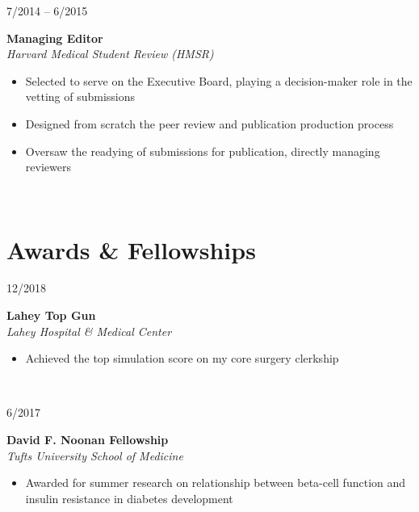 \documentclass{article}
\newcommand\colleft{.20}
\newcommand\colright{.75}
\newcommand{\entryfour}[4]
	{
		\begin{minipage}[t]{\colleft\textwidth}
		\hfill \textsc{#1}
		\end{minipage}
		\hfill\vline\hfill
		\begin{minipage}[t]{\colright\textwidth}
		{\bf#2}\\
		\textit{#3}
		\footnotesize{#4}
		\end{minipage}\\
		\entryvspace
	}%
\newcommand{\entryvspace}{\vspace{0.5em}}
\begin{document}

	\entryfour{7/2014 -- 6/2015}{Managing Editor}{Harvard Medical Student Review (HMSR)}{%
	\begin{itemize}
		\item Selected to serve on the Executive Board, playing a decision-maker role in the vetting of submissions
		\item Designed from scratch the peer review and publication production process
		\item Oversaw the readying of submissions for publication, directly managing reviewers
	\end{itemize}
	}

	\section*{Awards \& Fellowships}
	\entryfour{12/2018}{Lahey Top Gun}{Lahey Hospital \& Medical Center}{%
		\begin{itemize}
			\item Achieved the top simulation score on my core surgery clerkship
			\end{itemize}
		}
	
	\entryfour{6/2017}{David F. Noonan Fellowship}{Tufts University School of Medicine}{%
		\begin{itemize}
			\item Awarded for summer research on relationship between beta-cell function and insulin
			resistance in diabetes development
			\end{itemize}
		}
	
\end{document}
